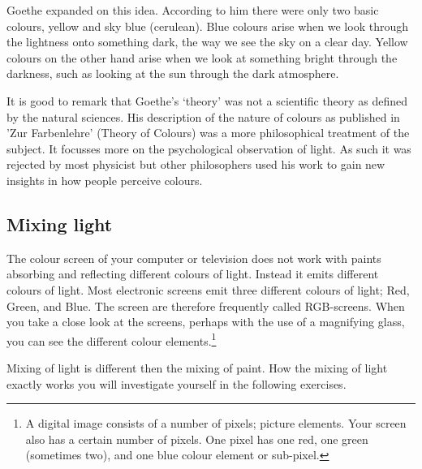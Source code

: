 \documentclass[12pt,a4paper]{article}
\numberwithin{equation}{section}
\numberwithin{figure}{section}
\numberwithin{table}{section}
\begin{document}
Goethe expanded on this idea. According to him there were only two basic colours, yellow and sky blue (cerulean). Blue colours arise when we look through the lightness onto something dark, the way we see the sky on a clear day. Yellow colours on the other hand arise when we look at something bright through the darkness, such as looking at the sun through the dark atmosphere.

It is good to remark that Goethe's `theory' was not a scientific theory as defined by the natural sciences. His description of the nature of colours as published in 'Zur Farbenlehre' (Theory of Colours) was a more philosophical treatment of the subject. It focusses more on the psychological observation of light. As such it was rejected by most physicist but other philosophers used his work to gain new insights in how people perceive colours.

\subsection{Mixing light}
The colour screen of your computer or television does not work with paints absorbing and reflecting different colours of light. Instead it emits different colours of light. Most electronic screens emit three different colours of light; Red, Green, and Blue. The screen are therefore frequently called RGB-screens. When you take a close look at the screens, perhaps with the use of a magnifying glass, you can see the different colour elements.\footnote{A digital image consists of a number of pixels; picture elements. Your screen also has a certain number of pixels. One pixel has one red, one green (sometimes two), and one blue colour element or sub-pixel.}

Mixing of light is different then the mixing of paint. How the mixing of light exactly works you will investigate yourself in the following exercises.
\end{document}
